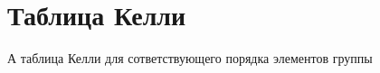 \section{Таблица Келли}
А таблица Келли для сответствующего порядка элементов группы

\begin{table}[H]
    \centering
\end{table}
